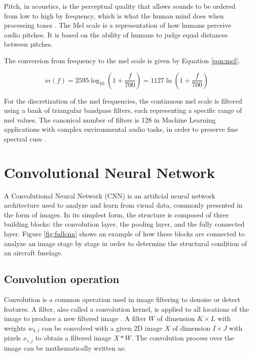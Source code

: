 Pitch, in acoustics, is the perceptual quality that allows sounds to be ordered from low to high by frequency, which is what the human mind does when processing tones \cite{melscale}. The Mel scale is a representation of how humans perceive audio pitches. It is based on the ability of humans to judge equal distances between pitches.

The conversion from frequency to the mel scale is given by Equation \ref{eqn:mel}.


\begin{equation}
\label{eqn:mel}
m(f) = 2595 \log_{10}\left(1 + \frac{f}{700}\right) = 1127 \ln\left(1 + \frac{f}{700}\right)
\end{equation}

For the discretization of the mel frequencies, the continuous mel scale is filtered using a bank of triangular bandpass filters, each representing a specific range of mel values. The canonical number of filters is 128 in Machine Learning applications with complex environmental audio tasks, in order to preserve fine spectral cues \cite{melscale}.


\section{Convolutional Neural Network}

A Convolutional Neural Network (CNN) is an artificial neural network architecture used to analyze and learn from visual data, commonly presented in the form of images. In its simplest form, the structure is composed of three building blocks: the convolution layer, the pooling layer, and the fully connected layer. Figure \ref{fig:fullcnn} shows an example of how these blocks are connected to analyze an image stage by stage in order to determine the structural condition of an aircraft fuselage.


\subsection{Convolution operation}

Convolution is a common operation used in image filtering to denoise or detect features. A filter, also called a convolution kernel, is applied to all locations of the image to produce a new filtered image \cite{convdef}. A filter \(W\) of dimension \(K \times L\) with weights \(w_{k,l}\) can be convolved with a given 2D image \(X\) of dimension \(I \times J\) with pixels \(x_{i,j}\) to obtain a filtered image \(X*W\). The convolution process over the image can be mathematically written as:

